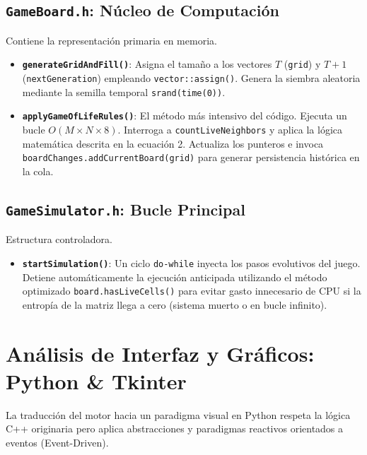 \documentclass[12pt,a4paper]{article}
\begin{document}
\subsection{\texttt{GameBoard.h}: Núcleo de Computación}
Contiene la representación primaria en memoria.
\begin{itemize}
    \item \textbf{\texttt{generateGridAndFill()}}: Asigna el tamaño a los vectores $T$ (\texttt{grid}) y $T+1$ (\texttt{nextGeneration}) empleando \texttt{vector::assign()}. Genera la siembra aleatoria mediante la semilla temporal \texttt{srand(time(0))}.
    \item \textbf{\texttt{applyGameOfLifeRules()}}: El método más intensivo del código. Ejecuta un bucle $O(M \times N \times 8)$. Interroga a \texttt{countLiveNeighbors} y aplica la lógica matemática descrita en la ecuación 2. Actualiza los punteros e invoca \texttt{boardChanges.addCurrentBoard(grid)} para generar persistencia histórica en la cola.
\end{itemize}

\subsection{\texttt{GameSimulator.h}: Bucle Principal}
Estructura controladora.
\begin{itemize}
    \item \textbf{\texttt{startSimulation()}}: Un ciclo \texttt{do-while} inyecta los pasos evolutivos del juego. Detiene automáticamente la ejecución anticipada utilizando el método optimizado \texttt{board.hasLiveCells()} para evitar gasto innecesario de CPU si la entropía de la matriz llega a cero (sistema muerto o en bucle infinito).
\end{itemize}

\newpage
\section{Análisis de Interfaz y Gráficos: Python \& Tkinter}
La traducción del motor hacia un paradigma visual en Python respeta la lógica C++ originaria pero aplica abstracciones y paradigmas reactivos orientados a eventos (Event-Driven).
\end{document}
